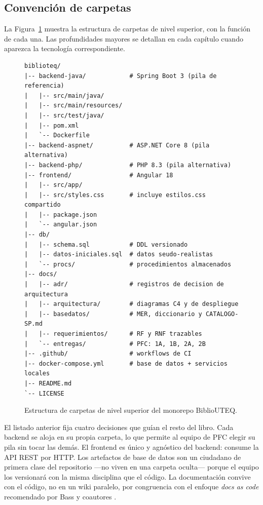 \subsection{Convenci\'on de carpetas}
\label{sec:u0:repo:carpetas}

La Figura~\ref{fig:u0:tree} muestra la estructura de carpetas de nivel superior, con la funci\'on de cada una. Las profundidades mayores se detallan en cada cap\'itulo cuando aparezca la tecnolog\'ia correspondiente.

\begin{figure}[htbp]
\begin{cajacodigo}
\begin{lstlisting}[style=markup]
biblioteq/
|-- backend-java/            # Spring Boot 3 (pila de referencia)
|   |-- src/main/java/
|   |-- src/main/resources/
|   |-- src/test/java/
|   |-- pom.xml
|   `-- Dockerfile
|-- backend-aspnet/          # ASP.NET Core 8 (pila alternativa)
|-- backend-php/             # PHP 8.3 (pila alternativa)
|-- frontend/                # Angular 18
|   |-- src/app/
|   |-- src/styles.css       # incluye estilos.css compartido
|   |-- package.json
|   `-- angular.json
|-- db/
|   |-- schema.sql           # DDL versionado
|   |-- datos-iniciales.sql  # datos seudo-realistas
|   `-- procs/               # procedimientos almacenados
|-- docs/
|   |-- adr/                 # registros de decision de arquitectura
|   |-- arquitectura/        # diagramas C4 y de despliegue
|   |-- basedatos/           # MER, diccionario y CATALOGO-SP.md
|   |-- requerimientos/      # RF y RNF trazables
|   `-- entregas/            # PFC: 1A, 1B, 2A, 2B
|-- .github/                 # workflows de CI
|-- docker-compose.yml       # base de datos + servicios locales
|-- README.md
`-- LICENSE
\end{lstlisting}
\end{cajacodigo}
\caption{Estructura de carpetas de nivel superior del monorepo BiblioUTEQ.}
\label{fig:u0:tree}
\end{figure}

El listado anterior fija cuatro decisiones que gu\'ian el resto del libro. Cada backend se aloja en su propia carpeta, lo que permite al equipo de PFC elegir su pila sin tocar las dem\'as. El frontend es \'unico y agn\'ostico del backend: consume la API REST por HTTP. Los artefactos de base de datos son un ciudadano de primera clase del repositorio ---no viven en una carpeta oculta--- porque el equipo los versionar\'a con la misma disciplina que el c\'odigo. La documentaci\'on convive con el c\'odigo, no en un wiki paralelo, por congruencia con el enfoque \emph{docs as code} recomendado por Bass y coautores \cite{bass2021software}.

